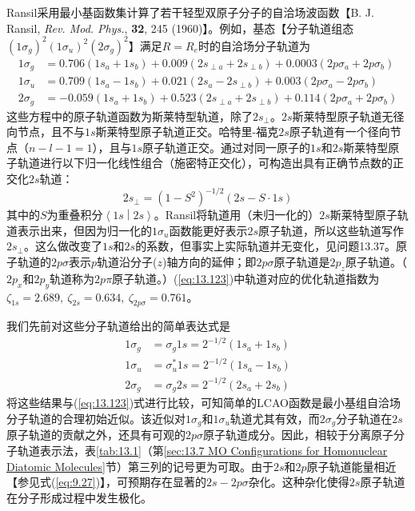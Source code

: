     Ransil采用最小基函数集计算了若干轻型双原子分子的自洽场波函数【B. J. Ransil, \textit{Rev. Mod. Phys.}, \textbf{32}, 245 (1960)】。例如，基态【分子轨道组态$\left(1\sigma_g\right)^2\left(1\sigma_u\right)^2\left(2\sigma_g\right)^2$】满足$R=R_e$时的自洽场分子轨道为
    \begin{equation}
        \begin{aligned}
            1\sigma_g &= 0.706\left(1s_a + 1s_b\right) + 0.009\left(2s_{\perp a} + 2s_{\perp b}\right) + 0.0003\left(2p\sigma_a + 2p\sigma_b\right) \\
            1\sigma_u &= 0.709 \left(1s_a - 1s_b\right) + 0.021 \left(2s_a - 2s_{\perp b}\right) + 0.003 \left(2p\sigma_a - 2p\sigma_b\right) \\
            2\sigma_{g} &= -0.059 \left(1s_{a} + 1s_{b}\right) + 0.523 \left(2s_{\perp a} + 2s_{\perp b}\right) + 0.114 \left(2p\sigma_{a} + 2p\sigma_{b}\right)
        \end{aligned}
        \label{eq:13.123}
    \end{equation}
    这些方程中的原子轨道函数为斯莱特型轨道，除了$2s_{\perp}$。$2s$斯莱特型原子轨道无径向节点，且不与$1s$斯莱特型原子轨道正交。哈特里-福克$2s$原子轨道有一个径向节点（$n-l-1=1$），且与$1s$原子轨道正交。通过对同一原子的$1s$和$2s$斯莱特型原子轨道进行以下归一化线性组合（施密特正交化），可构造出具有正确节点数的正交化$2s$轨道：
    \begin{equation}
        2s_{\perp}=\left(1-S^2\right)^{-1/2}\left(2s-S\cdot 1s\right)
        \label{eq:13.124}
    \end{equation}
    其中的$S$为重叠积分$\left\langle 1s \middle| 2s \right\rangle$。Ransil将轨道用（未归一化的）$2s$斯莱特型原子轨道表示出来，但因为归一化的$1\sigma_u$函数能更好表示$2s$原子轨道，所以这些轨道写作$2s_{\perp}$。这么做改变了$1s$和$2s$的系数，但事实上实际轨道并无变化，见问题13.37。原子轨道的$2p\sigma$表示$p$轨道沿分子($z$)轴方向的延伸；即$2p\sigma$原子轨道是$2p_z$原子轨道。（$2p_x$和$2p_y$轨道称为$2p\pi$原子轨道。）(\ref{eq:13.123})中轨道对应的优化轨道指数为$\zeta_{1s} = 2.689,\:\zeta_{2s} = 0.634,\:\zeta_{2p\sigma} = 0.761$。

    我们先前对这些分子轨道给出的简单表达式是
    \begin{equation*}
        \begin{aligned}
            1\sigma_g &= \sigma_g 1s = 2^{-1/2} (1s_a + 1s_b) \\
            1\sigma_{u} &= \sigma_{u}^{*}1s = 2^{-1/2}(1s_{a} - 1s_{b}) \\
            2\sigma_{g} &=\sigma_{g}2s=2^{-1/2}(2s_{a}+2s_{b})
        \end{aligned}
    \end{equation*}
    将这些结果与(\ref{eq:13.123})式进行比较，可知简单的LCAO函数是最小基组自洽场分子轨道的合理初始近似。该近似对$1\sigma_g$和$1\sigma_u$轨道尤其有效，而$2\sigma_g$分子轨道在$2s$原子轨道的贡献之外，还具有可观的$2p\sigma$原子轨道成分。因此，相较于分离原子分子轨道表示法，表\ref{tab:13.1}（第\ref{sec:13.7 MO Configurations for Homonuclear Diatomic Molecules}节）第三列的记号更为可取。由于$2s$和$2p$原子轨道能量相近【参见式(\ref{eq:9.27})】，可预期存在显著的$2s-2p\sigma$杂化。这种杂化使得$2s$原子轨道在分子形成过程中发生极化。

